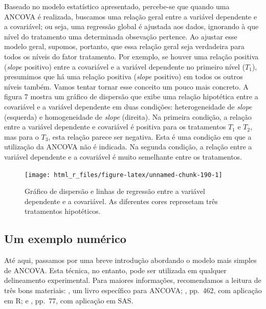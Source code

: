 \documentclass[
]{book}
\begin{document}
Baseado no modelo estatístico apresentado, percebe-se que quando uma ANCOVA é realizada, buscamos uma relação geral entre a variável dependente e a covariável; ou seja, uma regressão global é ajustada aos dados, ignorando à que nível do tratamento uma determinada obsevação pertence. Ao ajustar esse modelo geral, supomos, portanto, que essa relação geral seja verdadeira para todos os níveis do fator tratamento. Por exemplo, se houver uma relação positiva (\emph{slope} positivo) entre a covariável e a variável dependente no primeiro nível (\(T_1\)), presumimos que há uma relação positiva (\emph{slope} positivo) em todos os outros níveis também. Vamos tentar tornar esse conceito um pouco mais concreto. A figura 7 mostra um gráfico de dispersão que exibe uma relação hipotética entre a covariável e a variável dependente em duas condições: heterogeneidade de \emph{slope} (esquerda) e homogeneidade de \emph{slope} (direita). Na primeira condição, a relação entre a variável dependente e covariável é positiva para os tratamentos \(T_1\) e \(T_2\), mas para o \(T_3\), esta relação parece ser negativa. Esta é uma condição em que a utilização da ANCOVA não é indicada. Na segunda condição, a relação entre a variável dependente e a covariável é muito semelhante entre os tratamentos.

\begin{figure}

{\centering \texttt{[image: html\_r\_files/figure-latex/unnamed-chunk-190-1]} 

}

\caption{Gráfico de dispersão e linhas de regressão entre a variável dependente e a covariável. As diferentes cores represetam três tratamentos hipotéticos.}\label{fig:unnamed-chunk-190}
\end{figure}

   

\hypertarget{um-exemplo-numuxe9rico}{%
\subsection{Um exemplo numérico}\label{um-exemplo-numuxe9rico}}

Até aqui, passamos por uma breve introdução abordando o modelo mais simples de ANCOVA. Esta técnica, no entanto, pode ser utilizada em qualquer delineamento experimental. Para maiores informações, recomendamos a leitura de três bons materiais: \citet{Rutherford2001}, um livro específico para ANCOVA; \citet{Field2012}, pp.~462, com aplicação em R; e \citet{Scheiner2001}, pp.~77, com aplicação em SAS.
\end{document}
